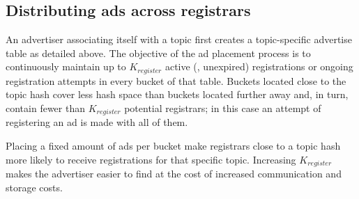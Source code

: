 
\subsection{Distributing ads across registrars}
\label{sec:registration_multi}

An advertiser associating itself with a topic first creates a topic-specific advertise table as detailed above.
The objective of the ad placement process is to continuously maintain up to $K_\textit{register}$ active (\ie, unexpired) registrations or ongoing registration attempts in every bucket of that table.
%
Buckets located close to the topic hash cover less hash space than buckets located further away and, in turn, contain fewer than $K_\textit{register}$ potential registrars; in this case an attempt of registering an ad is made with all of them.

Placing a fixed amount of ads per bucket make registrars close to a topic hash more likely to receive registrations for that specific topic. 
Increasing $K_\textit{register}$ makes the advertiser easier to find at the cost of increased communication and storage costs.

